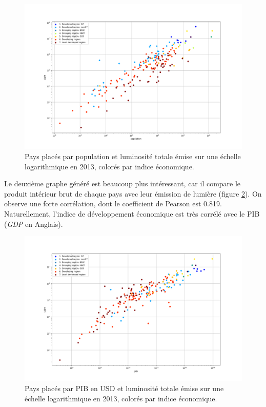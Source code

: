 \documentclass[a4paper, 11pt]{report}
\begin{document}
\begin{figure}
	\centering
	\includegraphics[width=1.0\textwidth]{img/population-light.png}
	\caption{Pays placés par population et luminosité totale émise sur une échelle logarithmique en 2013, colorés par indice économique.}
	\label{country_lightpop_scatter}
\end{figure}

Le deuxième graphe généré est beaucoup plus intéressant, car il compare le produit intérieur brut de chaque pays avec leur émission de lumière (figure \ref{country_gdppop_scatter}). On observe une forte corrélation, dont le coefficient de Pearson est 0.819.
Naturellement, l'indice de développement économique est très corrélé avec le PIB (\textit{GDP} en Anglais).

\begin{figure}
	\centering
	\includegraphics[width=1.0\textwidth]{img/gdp-light.png}
	\caption{Pays placés par PIB en USD et luminosité totale émise sur une échelle logarithmique en 2013, colorés par indice économique.}
	\label{country_gdppop_scatter}
\end{figure}
\end{document}

